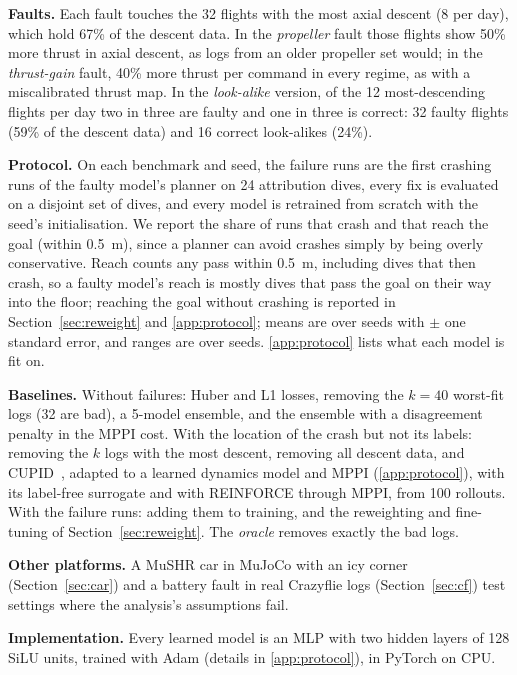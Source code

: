 \documentclass[preprint,12pt]{elsarticle}
\begin{document}
\textbf{Faults.} Each fault touches the 32 flights with the most axial descent (8 per day), which hold 67\% of the descent data. In the \emph{propeller} fault those flights show 50\% more thrust in axial descent, as logs from an older propeller set would; in the \emph{thrust-gain} fault, 40\% more thrust per command in every regime, as with a miscalibrated thrust map. In the \emph{look-alike} version, of the 12 most-descending flights per day two in three are faulty and one in three is correct: 32 faulty flights (59\% of the descent data) and 16 correct look-alikes (24\%).

\textbf{Protocol.} On each benchmark and seed, the failure runs are the first crashing runs of the faulty model's planner on 24 attribution dives, every fix is evaluated on a disjoint set of dives, and every model is retrained from scratch with the seed's initialisation. We report the share of runs that crash and that reach the goal (within 0.5~m), since a planner can avoid crashes simply by being overly conservative. Reach counts any pass within 0.5~m, including dives that then crash, so a faulty model's reach is mostly dives that pass the goal on their way into the floor; reaching the goal without crashing is reported in Section~\ref{sec:reweight} and \ref{app:protocol}; means are over seeds with $\pm$ one standard error, and ranges are over seeds. \ref{app:protocol} lists what each model is fit on.

\textbf{Baselines.} Without failures: Huber and L1 losses, removing the $k=40$ worst-fit logs (32 are bad), a 5-model ensemble, and the ensemble with a disagreement penalty in the MPPI cost. With the location of the crash but not its labels: removing the $k$ logs with the most descent, removing all descent data, and CUPID~\citep{agia2025cupid}, adapted to a learned dynamics model and MPPI (\ref{app:protocol}), with its label-free surrogate and with REINFORCE through MPPI, from 100 rollouts. With the failure runs: adding them to training, and the reweighting and fine-tuning of Section~\ref{sec:reweight}. The \emph{oracle} removes exactly the bad logs.

\textbf{Other platforms.} A MuSHR car in MuJoCo with an icy corner (Section~\ref{sec:car}) and a battery fault in real Crazyflie logs (Section~\ref{sec:cf}) test settings where the analysis's assumptions fail.

\textbf{Implementation.} Every learned model is an MLP with two hidden layers of 128 SiLU units, trained with Adam (details in \ref{app:protocol}), in PyTorch on CPU.
\end{document}
